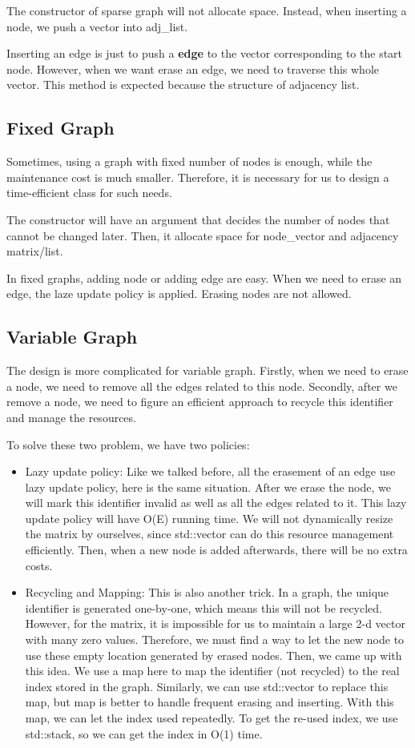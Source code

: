 \documentclass[]{article}
\begin{document}
The constructor of sparse graph will not allocate space. Instead, when inserting a node, we push a vector into adj\_list. 

Inserting an edge is just to push a \textbf{edge} to the vector corresponding to the start node. However, when we want erase an edge, we need to traverse this whole vector. This method is expected because the structure of adjacency list. 
\subsection{Fixed Graph}
Sometimes, using a graph with fixed number of nodes is enough, while the maintenance cost is much smaller.
Therefore, it is necessary for us to design a time-efficient class for such needs.

The constructor will have an argument that decides the number of nodes that cannot be changed later. Then,
it allocate space for node\_vector and adjacency matrix/list.

In fixed graphs, adding node or adding edge are easy. When we need to erase an edge, the laze update policy is applied. Erasing nodes are not allowed.

\subsection{Variable Graph}
The design is more complicated for variable graph. Firstly, when we need to erase a node, we need to remove all the edges related to this node.
Secondly, after we remove a node, we need to figure an efficient approach to recycle this identifier and manage the resources.

To solve these two problem, we have two policies:
\begin{itemize}
\item Lazy update policy: Like we talked before, all the erasement of an edge use lazy update policy, here is the same situation.
After we erase the node, we will mark this identifier invalid as well as all the edges related to it. This lazy update policy will have O(E) running time.
We will not dynamically resize the matrix by ourselves, since std::vector can do this resource management efficiently.
Then, when a new node is added afterwards, there will be no extra costs.
\item Recycling and Mapping: This is also another trick. In a graph, the unique identifier is generated one-by-one, which means this will not be recycled.
However, for the matrix, it is impossible for us to maintain a large 2-d vector with many zero values. Therefore, we must
find a way to let the new node to use these empty location generated by erased nodes. Then, we came up with this idea. We use a map here to map the identifier (not recycled) to the real index stored in the graph.
Similarly, we can use std::vector to replace this map, but map is better to handle frequent erasing and inserting. With this map, we can let the index used repeatedly.
To get the re-used index, we use std::stack, so we can get the index in O(1) time. 
\end{itemize}
\end{document}
